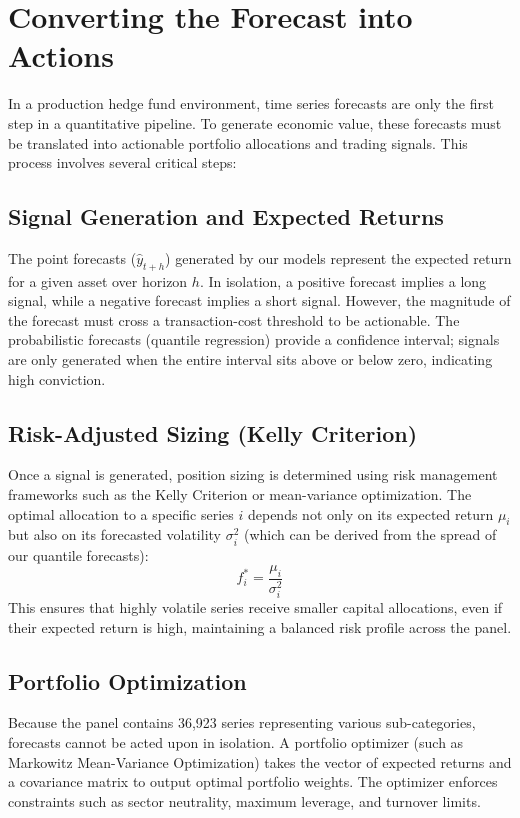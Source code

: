 \section{Converting the Forecast into Actions}
\label{sec:actions}

In a production hedge fund environment, time series forecasts are only the first step in a quantitative pipeline. To generate economic value, these forecasts must be translated into actionable portfolio allocations and trading signals. This process involves several critical steps:

\subsection{Signal Generation and Expected Returns}
The point forecasts ($\hat{y}_{t+h}$) generated by our models represent the expected return for a given asset over horizon $h$. In isolation, a positive forecast implies a long signal, while a negative forecast implies a short signal. However, the magnitude of the forecast must cross a transaction-cost threshold to be actionable. The probabilistic forecasts (quantile regression) provide a confidence interval; signals are only generated when the entire interval sits above or below zero, indicating high conviction.

\subsection{Risk-Adjusted Sizing (Kelly Criterion)}
Once a signal is generated, position sizing is determined using risk management frameworks such as the Kelly Criterion or mean-variance optimization. The optimal allocation to a specific series $i$ depends not only on its expected return $\mu_i$ but also on its forecasted volatility $\sigma_i^2$ (which can be derived from the spread of our quantile forecasts):
\begin{equation}
f_i^* = \frac{\mu_i}{\sigma_i^2}
\end{equation}
This ensures that highly volatile series receive smaller capital allocations, even if their expected return is high, maintaining a balanced risk profile across the panel.

\subsection{Portfolio Optimization}
Because the panel contains 36,923 series representing various sub-categories, forecasts cannot be acted upon in isolation. A portfolio optimizer (such as Markowitz Mean-Variance Optimization) takes the vector of expected returns and a covariance matrix to output optimal portfolio weights. The optimizer enforces constraints such as sector neutrality, maximum leverage, and turnover limits.

